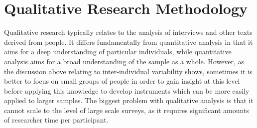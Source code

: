 

\section{Qualitative Research Methodology}

Qualitative research typically relates to the analysis of interviews and other texts derived from people. It differs fundamentally from quantitative analysis in that it aims for a deep understanding of particular individuals, while quantitative analysis aims for a broad understanding of the sample as a whole. However, as the discussion above relating to inter-individual variability shows, sometimes it is better to focus on small groups of people in order to gain insight at this level before applying this knowledge to develop instruments which can be more easily applied to larger samples. The biggest problem with qualitative analysis is that it cannot scale to the level of large scale surveys, as it requires significant amounts of researcher time per participant. %

